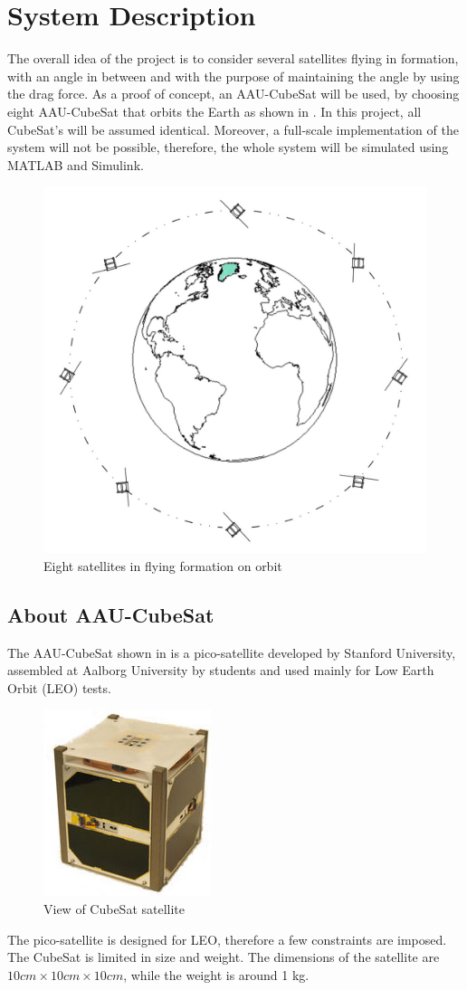 \chapter{System Description}\label{chap:systemDescribtion}
The overall idea of the project is to consider several satellites flying in formation, with an angle in between and with the purpose of maintaining the angle by using the drag force. As a proof of concept, an AAU-CubeSat will be used, by choosing eight AAU-CubeSat that orbits the Earth as shown in  . In this project, all CubeSat's will be assumed identical. Moreover, a full-scale implementation of the system will not be possible, therefore, the whole system will be simulated using MATLAB and Simulink. 
%
\begin{figure}[H]
	\centering
	\includegraphics[width=0.7\linewidth]{figures/sat_form}
	\caption{Eight satellites in flying formation on orbit}
	\label{fig:1}
\end{figure}
%
\section{About AAU-CubeSat}
The AAU-CubeSat shown in  is a pico-satellite developed by Stanford University,  assembled at Aalborg University by students and used mainly for Low Earth Orbit (LEO)  tests.
\begin{figure}[H]
	\centering
	\includegraphics[width=0.3\linewidth]{figures/cub}
	\caption{View of CubeSat satellite \cite{cs}}
	\label{fig:pico}
\end{figure}
The pico-satellite is designed for LEO, therefore a few constraints are imposed. The CubeSat is limited in size and weight. The dimensions of the satellite are $10cm\times10cm\times10cm$, while the weight is around 1 kg.\cite{CDS}

